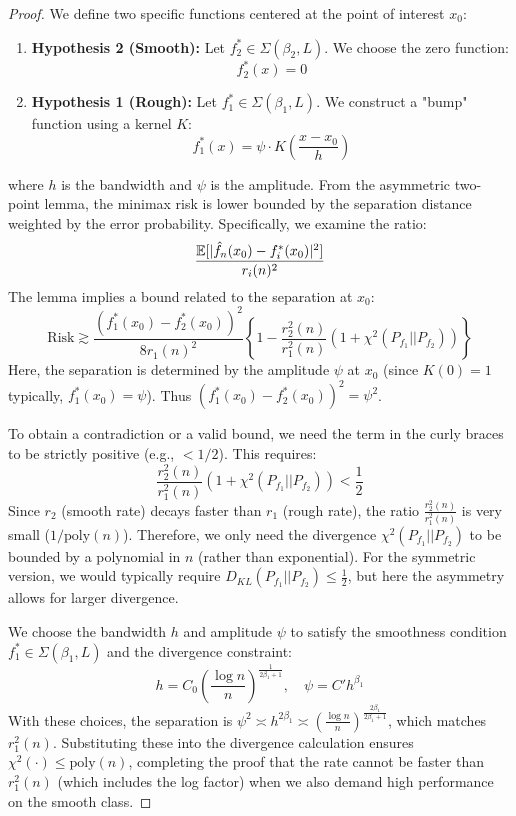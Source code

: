 \begin{proof}
    We define two specific functions centered at the point of interest $x_0$:
\begin{enumerate}
    \item \textbf{Hypothesis 2 (Smooth):} Let $f_2^* \in \Sigma(\beta_2, L)$. We choose the zero function:
    \[
    f_2^*(x) = 0
    \]
    \item \textbf{Hypothesis 1 (Rough):} Let $f_1^* \in \Sigma(\beta_1, L)$. We construct a "bump" function using a kernel $K$:
    \[
    f_1^*(x) = \psi \cdot K\left( \frac{x - x_0}{h} \right)
    \]
\end{enumerate}
where $h$ is the bandwidth and $\psi$ is the amplitude. From the asymmetric two-point lemma, the minimax risk is lower bounded by the separation distance weighted by the error probability. Specifically, we examine the ratio:
\[
\frac{\mathbb{E} [|\hat{f}_n(x_0) - f_i^*(x_0)|^2]}{r_i(n)^2}
\]
The lemma implies a bound related to the separation at $x_0$:
\[
\text{Risk} \gtrsim \frac{(f_1^*(x_0) - f_2^*(x_0))^2}{8 r_1(n)^2} \left\{ 1 - \frac{r_2^2(n)}{r_1^2(n)} \left( 1 + \chi^2(P_{f_1} || P_{f_2}) \right) \right\}
\]
Here, the separation is determined by the amplitude $\psi$ at $x_0$ (since $K(0)=1$ typically, $f_1^*(x_0) = \psi$). Thus $(f_1^*(x_0) - f_2^*(x_0))^2 = \psi^2$.


To obtain a contradiction or a valid bound, we need the term in the curly braces to be strictly positive (e.g., $< 1/2$). This requires:
\[
\frac{r_2^2(n)}{r_1^2(n)} \left( 1 + \chi^2(P_{f_1} || P_{f_2}) \right) < \frac{1}{2}
\]
Since $r_2$ (smooth rate) decays faster than $r_1$ (rough rate), the ratio $\frac{r_2^2(n)}{r_1^2(n)}$ is very small ($1/\text{poly}(n)$). Therefore, we only need the divergence $\chi^2(P_{f_1} || P_{f_2})$ to be bounded by a polynomial in $n$ (rather than exponential).
For the symmetric version, we would typically require $D_{KL}(P_{f_1} || P_{f_2}) \leq \frac{1}{2}$, but here the asymmetry allows for larger divergence.

We choose the bandwidth $h$ and amplitude $\psi$ to satisfy the smoothness condition $f_1^* \in \Sigma(\beta_1, L)$ and the divergence constraint:
\[
h = C_0 \left( \frac{\log n}{n} \right)^{\frac{1}{2\beta_1 + 1}}, \quad \psi = C' h^{\beta_1}
\]
With these choices, the separation is $\psi^2 \asymp h^{2\beta_1} \asymp \left( \frac{\log n}{n} \right)^{\frac{2\beta_1}{2\beta_1+1}}$, which matches $r_1^2(n)$.
Substituting these into the divergence calculation ensures $\chi^2(\cdot) \leq \text{poly}(n)$, completing the proof that the rate cannot be faster than $r_1^2(n)$ (which includes the log factor) when we also demand high performance on the smooth class.
\end{proof}

